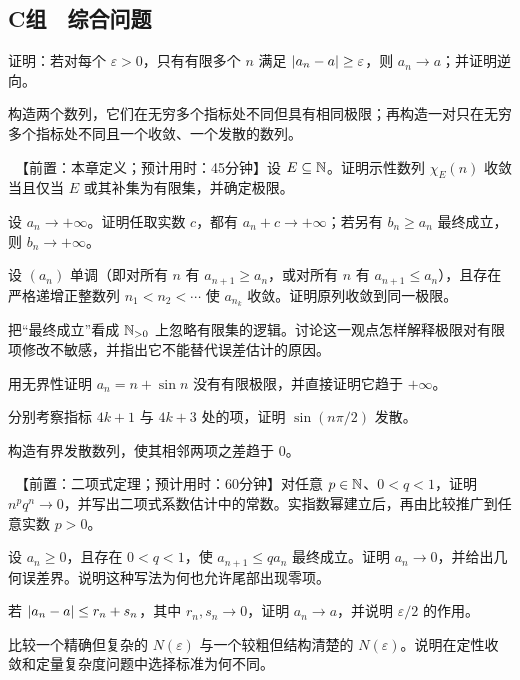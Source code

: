 \subsection*{C组　综合问题}
\begin{enumerate}[label=\textbf{\thechapter.\arabic*.},ref=\thechapter.\arabic*,leftmargin=3.4em,labelsep=0.7em,itemsep=0.85em,topsep=0.8em,resume]
  证明：若对每个 \(\varepsilon>0\)，只有有限多个 \(n\) 满足 \(\left|a_n-a\right|\ge\varepsilon\)，则 \(a_n\to a\)；并证明逆向。

  构造两个数列，它们在无穷多个指标处不同但具有相同极限；再构造一对只在无穷多个指标处不同且一个收敛、一个发散的数列。

 \ 【前置：本章定义；预计用时：45分钟】设 \(E\subseteq\mathbb{N}\)。证明示性数列 \(\chi_E(n)\) 收敛当且仅当 \(E\) 或其补集为有限集，并确定极限。

  设 \(a_n\to+\infty\)。证明任取实数 \(c\)，都有 \(a_n+c\to+\infty\)；若另有 \(b_n\ge a_n\) 最终成立，则 \(b_n\to+\infty\)。

  设 \((a_n)\) 单调（即对所有 \(n\) 有 \(a_{n+1}\ge a_n\)，或对所有 \(n\) 有 \(a_{n+1}\le a_n\)），且存在严格递增正整数列
 \(n_1<n_2<\cdots\) 使 \(a_{n_k}\) 收敛。证明原列收敛到同一极限。

  把“最终成立”看成 \(\mathbb{N}_{>0}\) 上忽略有限集的逻辑。讨论这一观点怎样解释极限对有限项修改不敏感，并指出它不能替代误差估计的原因。

  用无界性证明 \(a_n=n+\sin n\) 没有有限极限，并直接证明它趋于 \(+\infty\)。

  分别考察指标 \(4k+1\) 与 \(4k+3\) 处的项，证明
 \(\sin(n\pi/2)\) 发散。

  构造有界发散数列，使其相邻两项之差趋于 \(0\)。

 \ 【前置：二项式定理；预计用时：60分钟】对任意 \(p\in\mathbb{N}\)、\(0<q<1\)，证明 \(n^p q^n\to0\)，并写出二项式系数估计中的常数。实指数幂建立后，再由比较推广到任意实数 \(p>0\)。

  设 \(a_n\ge0\)，且存在 \(0<q<1\)，使 \(a_{n+1}\le q a_n\) 最终成立。证明 \(a_n\to0\)，并给出几何误差界。说明这种写法为何也允许尾部出现零项。

  若 \(\left|a_n-a\right|\le r_n+s_n\)，其中 \(r_n,s_n\to0\)，证明 \(a_n\to a\)，并说明 \(\varepsilon/2\) 的作用。

  比较一个精确但复杂的 \(N(\varepsilon)\) 与一个较粗但结构清楚的 \(N(\varepsilon)\)。说明在定性收敛和定量复杂度问题中选择标准为何不同。


\end{enumerate}
